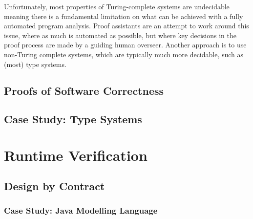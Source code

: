 Unfortunately, most properties of Turing-complete systems are
undecidable\cite{turing}\cite{rice} meaning there is a fundamental
limitation on what can be achieved with a fully automated program
analysis. Proof assistants\cite{proofassists} are an attempt to work
around this issue, where as much is automated as possible, but where
key decisions in the proof process are made by a guiding human
overseer. Another approach is to use non-Turing complete systems,
which are typically much more decidable, such as (most) type systems.

\subsection{Proofs of Software Correctness}
\label{sec:litrev-stat-proof}


\subsection{Case Study: Type Systems}
\label{sec:litrev-stat-types}


\section{Runtime Verification}
\label{sec:litrev-run}


\subsection{Design by Contract}
\label{sec:litrev-run-dbc}


\subsubsection{Case Study: Java Modelling Language}
\label{sec:litrev-run-dbc-jml}

